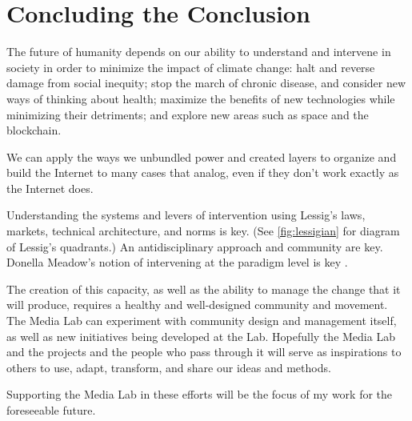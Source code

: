 \section{Concluding the Conclusion}

The future of humanity depends on our ability to understand and intervene in society in order to minimize the impact of climate change: halt and reverse damage from social inequity; stop the march of chronic disease, and consider new ways of thinking about health; maximize the benefits of new technologies while minimizing their detriments; and explore new areas such as space and the blockchain.

We can apply the ways we unbundled power and created layers to organize and build the Internet to many cases that analog, even if they don't work exactly as the Internet does. 

Understanding the systems and levers of intervention using Lessig's laws, markets, technical architecture, and norms is key. (See \autoref{fig:lessigian} for diagram of Lessig's quadrants.) An antidisciplinary approach and community are key. Donella Meadow's notion of intervening at the paradigm level is key \cite{meadows_leverage}.

The creation of this capacity, as well as the ability to manage the change that it will produce, requires a healthy and well-designed community and movement. The Media Lab can experiment with community design and management itself, as well as new initiatives being developed at the Lab. Hopefully the Media Lab and the projects and the people who pass through it will serve as inspirations to others to use, adapt, transform, and share our ideas and methods.

Supporting the Media Lab in these efforts will be the focus of my work for the foreseeable future.
